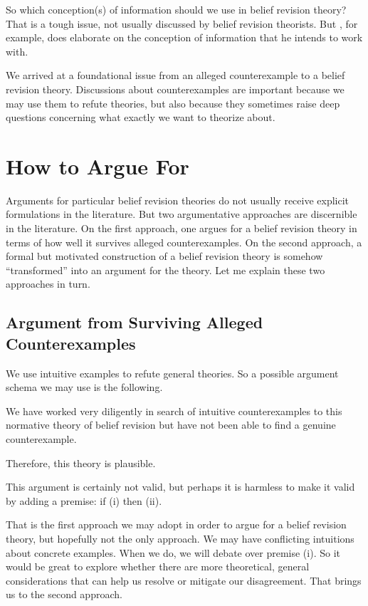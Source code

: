 So which conception(s) of information should we use in belief revision theory? That is a tough issue, not usually discussed by belief revision theorists. But \citet{gardenfors1988knowledge}, for example, does elaborate on the conception of information that he intends to work with.

We arrived at a foundational issue from an alleged counterexample to a belief revision theory. Discussions about counterexamples are important because we may use them to refute theories, but also because they sometimes raise deep questions concerning what exactly we want to theorize about. 


\section{How to Argue For}\label{sec-argue-for}

Arguments for particular belief revision theories do not usually receive explicit formulations in the literature. But two argumentative approaches are discernible in the literature. On the first approach, one argues for a belief revision theory in terms of how well it survives alleged counterexamples. On the second approach, a formal but motivated construction of a belief revision theory is somehow ``transformed'' into an argument for the theory. Let me explain these two approaches in turn.

\subsection{Argument from Surviving Alleged Counterexamples}

We use intuitive examples to refute general theories. So a possible argument schema we may use is the following.\op

	\im[(i)] We have worked very diligently in search of intuitive counterexamples to this normative theory of belief revision but have not been able to find a genuine counterexample. 

	\im[(ii)] Therefore, this theory is plausible.

\ed This argument is certainly not valid, but perhaps it is harmless to make it valid by adding a premise: if (i) then (ii).

That is the first approach we may adopt in order to argue for a belief revision theory, but hopefully not the only approach. We may have conflicting intuitions about concrete examples. When we do, we will debate over premise (i). So it would be great to explore whether there are more theoretical, general considerations that can help us resolve or mitigate our disagreement. That brings us to the second approach.

